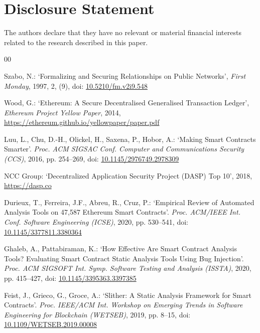 \documentclass{ieeeaccess}
\begin{document}
\section{Disclosure Statement}
The authors declare that they have no relevant or material financial interests related to the research described in this paper.

\begin{thebibliography}{00}

Szabo, N.: `Formalizing and Securing Relationships on Public Networks', \textit{First Monday}, 1997, 2, (9), doi: \href{https://doi.org/10.5210/fm.v2i9.548}{10.5210/fm.v2i9.548}

Wood, G.: `Ethereum: A Secure Decentralised Generalised Transaction Ledger', \textit{Ethereum Project Yellow Paper}, 2014, \url{https://ethereum.github.io/yellowpaper/paper.pdf}

Luu, L., Chu, D.-H., Olickel, H., Saxena, P., Hobor, A.: `Making Smart Contracts Smarter'. \textit{Proc. ACM SIGSAC Conf. Computer and Communications Security (CCS)}, 2016, pp. 254--269, doi: \href{https://doi.org/10.1145/2976749.2978309}{10.1145/2976749.2978309}

NCC Group: `Decentralized Application Security Project (DASP) Top 10', 2018, \url{https://dasp.co}

Durieux, T., Ferreira, J.F., Abreu, R., Cruz, P.: `Empirical Review of Automated Analysis Tools on 47,587 Ethereum Smart Contracts'. \textit{Proc. ACM/IEEE Int. Conf. Software Engineering (ICSE)}, 2020, pp. 530--541, doi: \href{https://doi.org/10.1145/3377811.3380364}{10.1145/3377811.3380364}

Ghaleb, A., Pattabiraman, K.: `How Effective Are Smart Contract Analysis Tools? Evaluating Smart Contract Static Analysis Tools Using Bug Injection'. \textit{Proc. ACM SIGSOFT Int. Symp. Software Testing and Analysis (ISSTA)}, 2020, pp. 415--427, doi: \href{https://doi.org/10.1145/3395363.3397385}{10.1145/3395363.3397385}

Feist, J., Grieco, G., Groce, A.: `Slither: A Static Analysis Framework for Smart Contracts'. \textit{Proc. IEEE/ACM Int. Workshop on Emerging Trends in Software Engineering for Blockchain (WETSEB)}, 2019, pp. 8--15, doi: \href{https://doi.org/10.1109/WETSEB.2019.00008}{10.1109/WETSEB.2019.00008}


\end{thebibliography}
\end{document}
